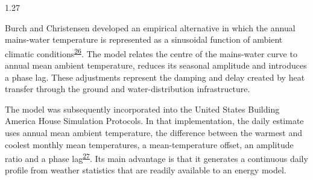 \documentclass[12pt,letterpaper]{article}
\DeclareRobustCommand{\citenum}[1]{\hyperlink{ref:#1}{#1}} %
\begin{document}
\begin{spacing}{1.27}
\vspace{0.15in}

Burch and Christensen developed an empirical alternative in which the annual mains-water temperature is represented as a sinusoidal function of ambient climatic conditions\textsuperscript{\citenum{26}}. The model relates the centre of the mains-water curve to annual mean ambient temperature, reduces its seasonal amplitude and introduces a phase lag. These adjustments represent the damping and delay created by heat transfer through the ground and water-distribution infrastructure.\par

\vspace{0.15in}

The model was subsequently incorporated into the United States Building America House Simulation Protocols. In that implementation, the daily estimate uses annual mean ambient temperature, the difference between the warmest and coolest monthly mean temperatures, a mean-temperature offset, an amplitude ratio and a phase lag\textsuperscript{\citenum{27}}. Its main advantage is that it generates a continuous daily profile from weather statistics that are readily available to an energy model.\par
\end{spacing}
\end{document}
